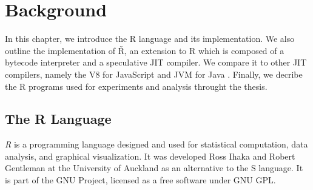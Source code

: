 \chapter{Background}

\begin{chapterabstract}
  In this chapter, we introduce the R language and its implementation. We also outline the implementation of Ř, an extension to R which is composed of a bytecode interpreter and a speculative JIT compiler. We compare it to other JIT compilers, namely the V8 for JavaScript and JVM for Java . Finally, we decribe the R programs used for experiments and analysis throught the thesis.
\end{chapterabstract}

\section{The R Language}

\textit{R}\cite{r} is a programming language designed and used for statistical computation, data analysis, and graphical visualization. It was developed Ross Ihaka and Robert Gentleman at the University of Auckland as an alternative to the S language. It is part of the GNU Project, licensed as a free software under GNU GPL.

